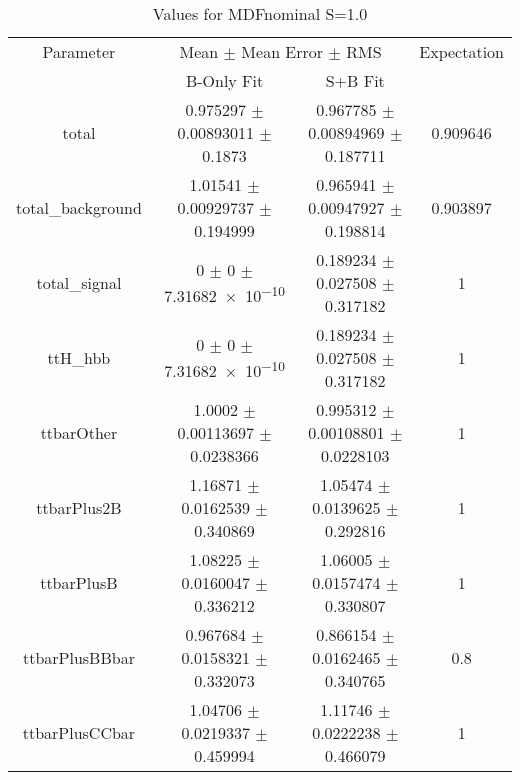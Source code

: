 \begin{table}
\centering
\caption{Values for MDFnominal S=1.0}
\begin{tabular}{cccc}
\toprule
Parameter & \multicolumn{2}{c}{Mean $\pm$ Mean Error $\pm$ RMS} & Expectation\\
 & B-Only Fit & S+B Fit & \\
\midrule
total & \num{0.975297} $\pm$ \num{0.00893011} $\pm$ \num{0.1873} & \num{0.967785} $\pm$ \num{0.00894969} $\pm$ \num{0.187711} & \num{0.909646}\\
total\_background & \num{1.01541} $\pm$ \num{0.00929737} $\pm$ \num{0.194999} & \num{0.965941} $\pm$ \num{0.00947927} $\pm$ \num{0.198814} & \num{0.903897}\\
total\_signal & \num{0} $\pm$ \num{0} $\pm$ \num{7.31682e-10} & \num{0.189234} $\pm$ \num{0.027508} $\pm$ \num{0.317182} & \num{1}\\
ttH\_hbb & \num{0} $\pm$ \num{0} $\pm$ \num{7.31682e-10} & \num{0.189234} $\pm$ \num{0.027508} $\pm$ \num{0.317182} & \num{1}\\
ttbarOther & \num{1.0002} $\pm$ \num{0.00113697} $\pm$ \num{0.0238366} & \num{0.995312} $\pm$ \num{0.00108801} $\pm$ \num{0.0228103} & \num{1}\\
ttbarPlus2B & \num{1.16871} $\pm$ \num{0.0162539} $\pm$ \num{0.340869} & \num{1.05474} $\pm$ \num{0.0139625} $\pm$ \num{0.292816} & \num{1}\\
ttbarPlusB & \num{1.08225} $\pm$ \num{0.0160047} $\pm$ \num{0.336212} & \num{1.06005} $\pm$ \num{0.0157474} $\pm$ \num{0.330807} & \num{1}\\
ttbarPlusBBbar & \num{0.967684} $\pm$ \num{0.0158321} $\pm$ \num{0.332073} & \num{0.866154} $\pm$ \num{0.0162465} $\pm$ \num{0.340765} & \num{0.8}\\
ttbarPlusCCbar & \num{1.04706} $\pm$ \num{0.0219337} $\pm$ \num{0.459994} & \num{1.11746} $\pm$ \num{0.0222238} $\pm$ \num{0.466079} & \num{1}\\
\bottomrule
\end{tabular}
\end{table}